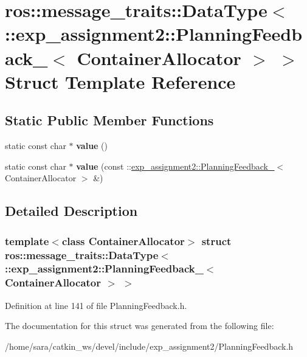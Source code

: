 \hypertarget{structros_1_1message__traits_1_1DataType_3_01_1_1exp__assignment2_1_1PlanningFeedback___3_01ContainerAllocator_01_4_01_4}{}\section{ros\+:\+:message\+\_\+traits\+:\+:Data\+Type$<$ \+:\+:exp\+\_\+assignment2\+:\+:Planning\+Feedback\+\_\+$<$ Container\+Allocator $>$ $>$ Struct Template Reference}
\label{structros_1_1message__traits_1_1DataType_3_01_1_1exp__assignment2_1_1PlanningFeedback___3_01ContainerAllocator_01_4_01_4}
\subsection*{Static Public Member Functions}
\begin{DoxyCompactItemize}
\item 
\mbox{\label{structros_1_1message__traits_1_1DataType_3_01_1_1exp__assignment2_1_1PlanningFeedback___3_01ContainerAllocator_01_4_01_4_ad26ecc2c69abb11be69cdbc91548f269}} 
static const char $\ast$ {\bfseries value} ()
\item 
\mbox{\label{structros_1_1message__traits_1_1DataType_3_01_1_1exp__assignment2_1_1PlanningFeedback___3_01ContainerAllocator_01_4_01_4_a025878ba0602491f8cd836cdc835a53c}} 
static const char $\ast$ {\bfseries value} (const \+::\hyperlink{structexp__assignment2_1_1PlanningFeedback__}{exp\+\_\+assignment2\+::\+Planning\+Feedback\+\_\+}$<$ Container\+Allocator $>$ \&)
\end{DoxyCompactItemize}


\subsection{Detailed Description}
\subsubsection*{template$<$class Container\+Allocator$>$\newline
struct ros\+::message\+\_\+traits\+::\+Data\+Type$<$ \+::exp\+\_\+assignment2\+::\+Planning\+Feedback\+\_\+$<$ Container\+Allocator $>$ $>$}



Definition at line 141 of file Planning\+Feedback.\+h.



The documentation for this struct was generated from the following file\+:\begin{DoxyCompactItemize}
\item 
/home/sara/catkin\+\_\+ws/devel/include/exp\+\_\+assignment2/Planning\+Feedback.\+h\end{DoxyCompactItemize}
